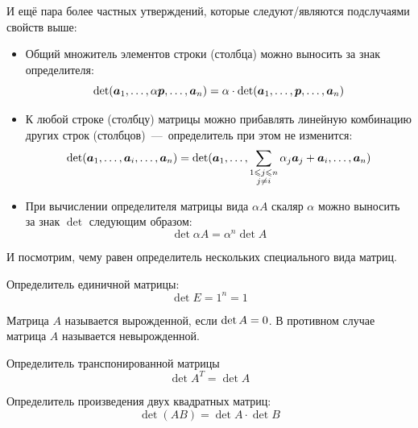 \documentclass[a4paper,12pt]{article}
\begin{document}
  И ещё пара более частных утверждений, которые следуют/являются подслучаями свойств выше:
  \begin{itemize}
    \item Общий множитель элементов строки (столбца) можно выносить за знак определителя:
      \[
        \det (\boldsymbol a_1, \ldots, \alpha \boldsymbol p, \ldots, \boldsymbol a_n)
          = \alpha \cdot \det (\boldsymbol a_1, \ldots, \boldsymbol p, \ldots, \boldsymbol a_n)
      \]
    \item К любой строке (столбцу) матрицы можно прибавлять линейную комбинацию других строк (столбцов)~---~определитель при этом не изменится:
      \[
        \det (\boldsymbol a_1, \ldots, \boldsymbol a_i, \ldots, \boldsymbol a_n)
          = \det (\boldsymbol a_1, \ldots, \sum_{\substack{1 \leqslant j \leqslant n\\j \not= i}} \alpha_j \boldsymbol a_j + \boldsymbol a_i, \ldots, \boldsymbol a_n)
      \]
    \item При вычислении определителя матрицы вида $\alpha A$ скаляр $\alpha$ можно выносить за знак $\det$ следующим образом:
      \[
        \det \alpha A = \alpha^n \det A
      \]
  \end{itemize}
  
  И посмотрим, чему равен определитель нескольких специального вида матриц.
  
  \begin{example}
    Определитель единичной матрицы:
    \[
      \det E = 1^n = 1
    \]
  \end{example}
  
  \begin{definition}[Вырожденная матрица\footnote{Определение вырожденной матрицы можно вводить по-разному. Ещё возможный вариант: квадратная матрица называется вырожденной, если её строки $\{\bds a_i\}_{i=1}^n$ линейно зависимы. Строки линейно зависимы~---~когда существует нетривиальная линейная комбинация строк, которая даёт нулевую строку: $\sum_{i=1}^n \alpha_i \bds a_i \hm= \bds 0$, $\sum_{i=1}^n \alpha_i^2 \hm > 0$.}]
    Матрица $A$ называется вырожденной, если $\det A \hm= 0$.
    В противном случае матрица $A$ называется невырожденной.
  \end{definition}
  
  \begin{theorem}
    Определитель транспонированной матрицы
    \[
      \det A^T = \det A
    \]
  \end{theorem}
  
  \begin{theorem}
    Определитель произведения двух квадратных матриц:
    \[
      \det (AB) = \det A \cdot \det B
    \]
  \end{theorem}
  
\end{document}
